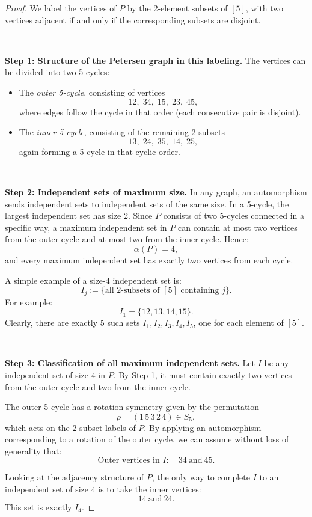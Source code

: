 \documentclass[12pt,a4paper,openany]{book}
\begin{document}
\begin{proof}
We label the vertices of \(P\) by the 2-element subsets of \([5]\), with two vertices adjacent if and only if the corresponding subsets are disjoint.  

---

\textbf{Step 1: Structure of the Petersen graph in this labeling.}  
The vertices can be divided into two 5-cycles:
\begin{itemize}
    \item The \emph{outer 5-cycle}, consisting of vertices
    \[
    12,\; 34,\; 15,\; 23,\; 45,
    \]
    where edges follow the cycle in that order (each consecutive pair is disjoint).
    \item The \emph{inner 5-cycle}, consisting of the remaining 2-subsets
    \[
    13,\; 24,\; 35,\; 14,\; 25,
    \]
    again forming a 5-cycle in that cyclic order.
\end{itemize}

---

\textbf{Step 2: Independent sets of maximum size.}  
In any graph, an automorphism sends independent sets to independent sets of the same size. In a 5-cycle, the largest independent set has size 2. Since \(P\) consists of two 5-cycles connected in a specific way, a maximum independent set in \(P\) can contain at most two vertices from the outer cycle and at most two from the inner cycle. Hence:
\[
\alpha(P) = 4,
\]
and every maximum independent set has exactly two vertices from each cycle.

A simple example of a size-4 independent set is:
\[
I_j := \{\text{all 2-subsets of } [5] \text{ containing } j\}.
\]
For example:
\[
I_1 = \{12, 13, 14, 15\}.
\]
Clearly, there are exactly 5 such sets \(I_1, I_2, I_3, I_4, I_5\), one for each element of \([5]\).

---

\textbf{Step 3: Classification of all maximum independent sets.}  
Let \(I\) be any independent set of size 4 in \(P\). By Step 1, it must contain exactly two vertices from the outer cycle and two from the inner cycle.  

The outer 5-cycle has a rotation symmetry given by the permutation
\[
\rho = (1\,5\,3\,2\,4) \in S_5,
\]
which acts on the 2-subset labels of \(P\). By applying an automorphism corresponding to a rotation of the outer cycle, we can assume without loss of generality that:
\[
\text{Outer vertices in } I: \quad 34 \ \text{and} \ 45.
\]

Looking at the adjacency structure of \(P\), the only way to complete \(I\) to an independent set of size 4 is to take the inner vertices:
\[
14 \ \text{and} \ 24.
\]
This set is exactly \(I_4\).


\end{proof}
\end{document}
